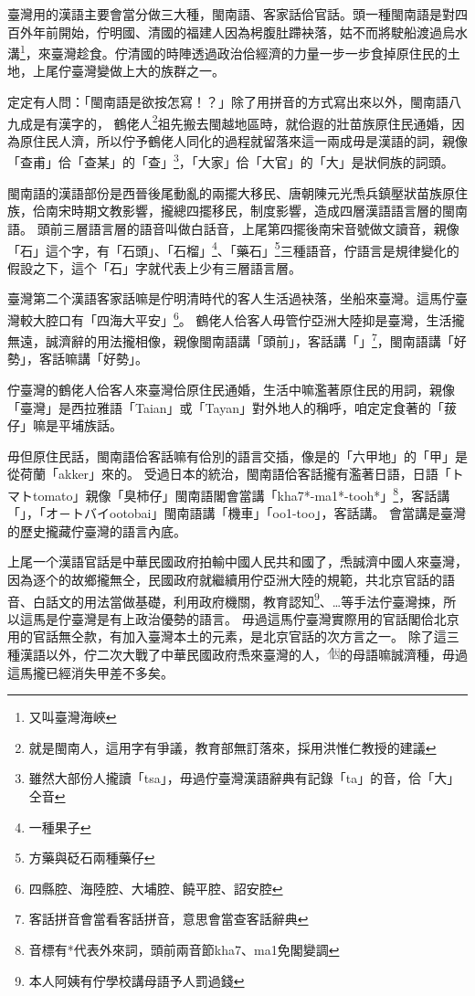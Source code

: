 \documentclass[final,oneside,onecolumn,12pt,a4paper]{book}%
\begin{document}
臺灣用的漢語主要會當分做三大種，閩南語、客家話佮官話\cite{外省族群的母語與國語}。頭一種閩南語是對四百外年前開始，佇明國、清國的福建人因為枵腹肚蹛袂落，姑不而將駛船渡過烏水溝\footnote{又叫臺灣海峽}，來臺灣趁食。佇清國的時陣透過政治佮經濟的力量一步一步食掉原住民的土地，上尾佇臺灣變做上大的族群之一。

定定有人問：「閩南語是欲按怎寫！？」除了用拼音的方式寫出來以外，閩南語八九成是有漢字的\cite{愛揣}，%
鶴佬人\footnote{就是閩南人，這用字有爭議，教育部無訂落來，採用洪惟仁教授的建議\cite{愛揣}}祖先搬去閩越地區時，就佮遐的壯苗族原住民通婚，因為原住民人濟，所以佇予鶴佬人同化的過程就留落來這一兩成毋是漢語的詞\cite{董忠司}，親像「查甫」佮「查某」的「查」\footnote{雖然大部份人攏讀「tsa」，毋過佇臺灣漢語辭典\cite{臺灣漢語辭典}有記錄「ta」的音，佮「大」仝音}，「大家」佮「大官」的「大」是狀侗族的詞頭。

閩南語的漢語部份是西晉後尾動亂的兩擺大移民、唐朝陳元光𤆬兵鎮壓狀苗族原住族，佮南宋時期文教影響，攏總四擺移民，制度影響，造成四層漢語語言層的閩南語\cite{閩客方言史稿}。
頭前三層語言層的語音叫做白話音，上尾第四擺後南宋音號做文讀音，親像「石」這个字，有「石頭」、「石榴」\footnote{一種果子}、「藥石」\footnote{方藥與砭石兩種藥仔}三種語音，佇語言是規律變化的假設之下，這个「石」字就代表上少有三層語言層。

臺灣第二个漢語客家話嘛是佇明清時代的客人生活過袂落，坐船來臺灣。這馬佇臺灣較大腔口有「四海大平安」\footnote{四縣腔、海陸腔、大埔腔、饒平腔、詔安腔}。
鶴佬人佮客人毋管佇亞洲大陸抑是臺灣，生活攏無遠，誠濟辭的用法攏相像，親像閩南語講「頭前」，客話講「」\footnote{客話拼音會當看客話拼音\cite{客話拼音}，意思會當查客話辭典\cite{客話辭典}}，閩南語講「好勢」，客話嘛講「好勢」。

佇臺灣的鶴佬人佮客人來臺灣佮原住民通婚，生活中嘛濫著原住民的用詞，親像「臺灣」是西拉雅語「Taian」或「Tayan」對外地人的稱呼\cite{台灣名稱的由來}，咱定定食著的「菝仔」嘛是平埔族話\cite{客語外來語}。

毋但原住民話，閩南語佮客話嘛有佮別的語言交插，像是的「六甲地」的「甲」是從荷蘭「akker」來的\cite{台甲}。
受過日本的統治，閩南語佮客話攏有濫著日語，日語「トマトtomato」親像「臭柿仔」閩南語閣會當講「kha7*-ma1*-tooh*」\footnote{音標有*代表外來詞，頭前兩音節kha7、ma1免閣變調}，客話講「」，「オ－トバイootobai」閩南語講「機車」「oo1-too」，客話講。
會當講是臺灣的歷史攏藏佇臺灣的語言內底。

上尾一个漢語官話是中華民國政府拍輸中國人民共和國了，𤆬誠濟中國人來臺灣，因為逐个的故鄉攏無仝\cite{外省族群的母語與國語}，民國政府就繼續用佇亞洲大陸的規範，共北京官話的語音、白話文的用法當做基礎，利用政府機關，教育認知\footnote{本人阿姨有佇學校講母語予人罰過錢}、…等手法佇臺灣捒，所以這馬是佇臺灣是有上政治優勢的語言。
毋過這馬佇臺灣實際用的官話閣佮北京用的官話無仝款，有加入臺灣本土的元素，是北京官話的次方言之一。
除了這三種漢語以外，佇二次大戰了中華民國政府𤆬來臺灣的人，\includegraphics[height=1em]{字/⿰因}的母語嘛誠濟種，毋過這馬攏已經消失甲差不多矣。
\end{document}

